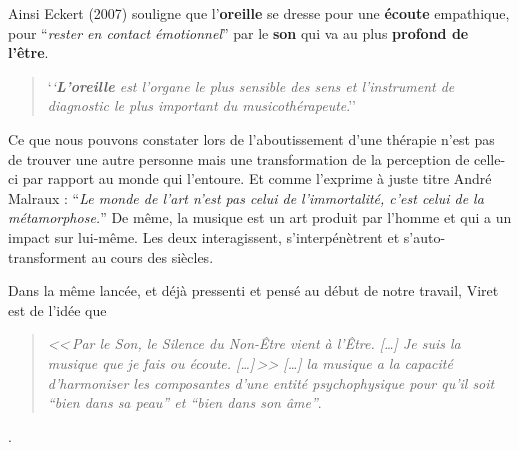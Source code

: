  

 Ainsi Eckert (2007) souligne que l'\textbf{oreille }se dresse pour une\textbf{ écoute} empathique, pour ``\textit{rester en contact émotionnel}'' par le \textbf{son} qui va au plus \textbf{profond de
   l'être}.
\begin{quotation}
	`\textit{`\textbf{L'oreille }est l'organe le plus sensible des sens 
et l'instrument de diagnostic  le plus important du
musicothérapeute}.''\autocite{seminar_zuerich}
 \end{quotation}	
Ce que nous pouvons constater lors de l'aboutissement
d'une thérapie n'est pas de trouver une autre personne mais une transformation
de la perception de celle-ci par rapport au monde qui l'entoure.
Et comme l'exprime à juste titre André Malraux : \enquote{\emph{Le monde de
	l'art n'est pas celui de l'immortalité, c'est celui de la métamorphose.}}
De même, la musique est un art produit par l'homme et qui a un impact
sur lui-même. Les deux interagissent, s'interpénètrent et s'auto-transforment
au cours des siècles.







 




 


Dans la même lancée, et déjà pressenti et  pensé au début de notre travail, Viret
est de l'idée que\label{jeSuisLaMusique:viret}
\begin{quotation}
\emph{<<\,\emph{Par le Son, le Silence du Non-Être vient à l'Être}. [\dots] 
\textsl{Je suis}
	\emph{la musique que je fais ou écoute}. [\dots]\,>>
[\ldots] \emph{la musique a la capacité d'harmoniser
les composantes d'une entité psychophysique pour qu'il soit ``bien
dans sa peau'' et ``bien dans son âme}''}.\, \autocite[ch. 1, p.8]{viret:b}
\end{quotation}.



